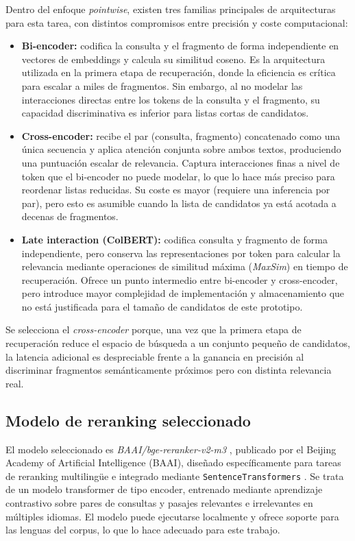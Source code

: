 Dentro del enfoque \textit{pointwise}, existen tres familias principales de arquitecturas para esta tarea, con distintos compromisos entre precisión y coste computacional:

\begin{itemize}
    \item \textbf{Bi-encoder:} codifica la consulta y el fragmento de forma independiente en vectores de embeddings y calcula su similitud coseno. Es la arquitectura utilizada en la primera etapa de recuperación, donde la eficiencia es crítica para escalar a miles de fragmentos. Sin embargo, al no modelar las interacciones directas entre los tokens de la consulta y el fragmento, su capacidad discriminativa es inferior para listas cortas de candidatos.
    \item \textbf{Cross-encoder:} recibe el par (consulta, fragmento) concatenado como una única secuencia y aplica atención conjunta sobre ambos textos, produciendo una puntuación escalar de relevancia. Captura interacciones finas a nivel de token que el bi-encoder no puede modelar, lo que lo hace más preciso para reordenar listas reducidas. Su coste es mayor (requiere una inferencia por par), pero esto es asumible cuando la lista de candidatos ya está acotada a decenas de fragmentos.
    \item \textbf{Late interaction (ColBERT):} codifica consulta y fragmento de forma independiente, pero conserva las representaciones por token para calcular la relevancia mediante operaciones de similitud máxima (\textit{MaxSim}) en tiempo de recuperación. Ofrece un punto intermedio entre bi-encoder y cross-encoder, pero introduce mayor complejidad de implementación y almacenamiento que no está justificada para el tamaño de candidatos de este prototipo.
\end{itemize}

Se selecciona el \textit{cross-encoder} porque, una vez que la primera etapa de recuperación reduce el espacio de búsqueda a un conjunto pequeño de candidatos, la latencia adicional es despreciable frente a la ganancia en precisión al discriminar fragmentos semánticamente próximos pero con distinta relevancia real.

\subsection{Modelo de reranking seleccionado}\label{subsec:modelo-reranking}

El modelo seleccionado es \textit{BAAI/bge-reranker-v2-m3} \cite{chen2024bgem3}, publicado por el Beijing Academy of Artificial Intelligence (BAAI), diseñado específicamente para tareas de reranking multilingüe e integrado mediante \texttt{SentenceTransformers} \cite{sentenceTransformersCrossEncoder}.
Se trata de un modelo transformer de tipo encoder, entrenado mediante aprendizaje contrastivo sobre pares de consultas y pasajes relevantes e irrelevantes en múltiples idiomas.
El modelo puede ejecutarse localmente y ofrece soporte para las lenguas del corpus, lo que lo hace adecuado para este trabajo.

